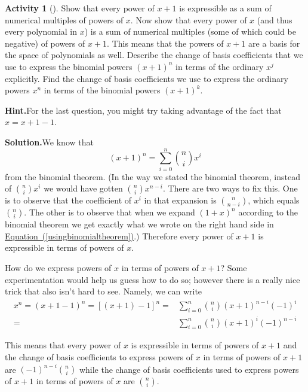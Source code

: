 \documentclass[10pt,]{book}
\theoremstyle{plain}
\theoremstyle{definition}
\newtheorem{activity}[project]{Activity}
\numberwithin{equation}{chapter}
\newcommand{\amp}{&}
\begin{document}
\begin{activity}[]\label{activity-143}
Show that every power of \(x+1\) is expressible as a sum of numerical multiples of powers of \(x\). Now show that every power of \(x\) (and thus every polynomial in \(x\)) is a sum of numerical multiples (some of which could be negative) of powers of \(x+1\). This means that the powers of \(x+1\) are a basis for the space of polynomials as well. Describe the change of basis coefficients that we use to express the binomial powers \((x+1)^n\) in terms of the ordinary \(x^j\) explicitly. Find the change of basis coefficients we use to express the ordinary powers \(x^n\) in terms of the binomial powers \((x+1)^k\).%
\par\medskip\noindent%
\textbf{Hint.}\quad For the last question, you might try taking advantage of the fact that \(x = x + 1 - 1\).%
\par\medskip\noindent%
\textbf{Solution.}\quad We know that%
\begin{equation}
(x+1)^n=\sum_{i=0}^n \binom{n}{i}x^{i}\label{usingbinomialtheorem}
\end{equation}
from the binomial theorem. (In the way we stated the binomial theorem, instead of \(\binom{n}{i}x^i\) we would have gotten \(\binom{n}{i}x^{n-i}\). There are two ways to fix this. One is to observe that the coefficient of \(x^i\) in that expansion is \(\binom{n}{n-i}\), which equals \(\binom{n}{i}\). The other is to observe that when we expand \((1+x)^n\) according to the binomial theorem we get exactly what we wrote on the right hand side in \hyperref[usingbinomialtheorem]{Equation~(\ref{usingbinomialtheorem})}.) Therefore every power of \(x+1\) is expressible in terms of powers of \(x\).%
\par
How do we express powers of \(x\) in terms of powers of \(x+1\)? Some experimentation would help us guess how to do so; however there is a really nice trick that also isn't hard to see. Namely, we can write%
\begin{align*}
x^n =(x+1-1)^n= [(x+1) -1]^n =\amp  \sum_{i=0}^n \binom{n}{i}(x+1)^{n-i}(-1)^i\\
=\amp
\sum_{i=0}^n \binom{n}{i}(x+1)^i(-1)^{n-i}
\end{align*}
%
\par
This means that every power of \(x\) is expressible in terms of powers of \(x+1\) and the change of basis coefficients to express powers of \(x\) in terms of powers of \(x+1\) are \((-1)^{n-i}\binom{n}{i}\) while the change of basis coefficients used to express powers of \(x+1\) in terms of powers of \(x\) are \(\binom{n}{i}\).%
\end{activity}
\end{document}
